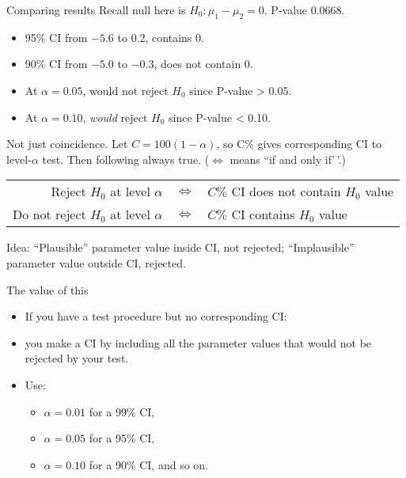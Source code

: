 \documentclass[
  ignorenonframetext,
]{beamer}
\providecommand{\tightlist}{%
  \setlength{\itemsep}{0pt}\setlength{\parskip}{0pt}}
\begin{document}
\begin{frame}{Comparing results}
\protect\hypertarget{comparing-results}{}
Recall null here is \(H_0 : \mu_1 - \mu_2 = 0\). P-value 0.0668.

\begin{itemize}
\tightlist
\item
  95\% CI from \(-5.6\) to 0.2, contains 0.
\item
  90\% CI from \(-5.0\) to \(-0.3\), does not contain 0.
\item
  At \(\alpha = 0.05\), would not reject \(H_0\) since P-value
  \textgreater{} 0.05.
\item
  At \(\alpha = 0.10\), \emph{would} reject \(H_0\) since P-value
  \textless{} 0.10.
\end{itemize}

Not just coincidence. Let \(C = 100(1 - \alpha)\), so C\% gives
corresponding CI to level-\(\alpha\) test. Then following always true.
(\(\iff\) means ``if and only if'\,'.)

\begin{tabular}{|rcl|}
  \hline
  Reject $H_0$ at level $\alpha$ & $\iff$ & $C\%$ CI does not contain $H_0$ value\\
  Do not reject $H_0$ at level $\alpha$ & $\iff$ & $C\%$ CI contains $H_0$ value\\
  \hline
\end{tabular}

Idea: ``Plausible'' parameter value inside CI, not rejected;
``Implausible'' parameter value outside CI, rejected.
\end{frame}

\begin{frame}{The value of this}
\protect\hypertarget{the-value-of-this}{}
\begin{itemize}
\tightlist
\item
  If you have a test procedure but no corresponding CI:
\item
  you make a CI by including all the parameter values that would not be
  rejected by your test.
\item
  Use:

  \begin{itemize}
  \tightlist
  \item
    \(\alpha = 0.01\) for a 99\% CI,
  \item
    \(\alpha = 0.05\) for a 95\% CI,
  \item
    \(\alpha = 0.10\) for a 90\% CI, and so on.
  \end{itemize}
\end{itemize}
\end{frame}
\end{document}
